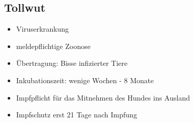     \subsection{Tollwut}
    \begin{itemize}
        \item Viruserkrankung
        \item meldepflichtige Zoonose
        \item Übertragung: Bisse infizierter Tiere
        \item Inkubationszeit: wenige Wochen - 8 Monate
        \item Impfpflicht für das Mitnehmen des Hundes ins Ausland
        \item Impfschutz erst 21 Tage nach Impfung
    \end{itemize}